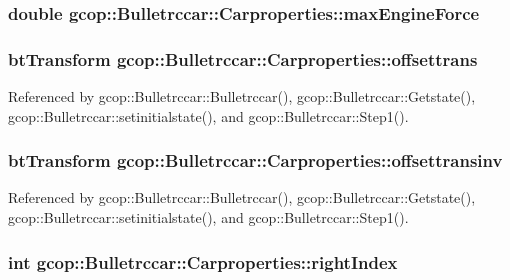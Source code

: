 \subsubsection[{max\-Engine\-Force}]{\setlength{\rightskip}{0pt plus 5cm}double {\bf gcop\-::\-Bulletrccar\-::\-Carproperties\-::max\-Engine\-Force}}\label{structgcop_1_1Bulletrccar_1_1Carproperties_a1d82405d62cf0f7b07b8f841ffb00aec}
\subsubsection[{offsettrans}]{\setlength{\rightskip}{0pt plus 5cm}bt\-Transform {\bf gcop\-::\-Bulletrccar\-::\-Carproperties\-::offsettrans}}\label{structgcop_1_1Bulletrccar_1_1Carproperties_a66f14b79d8519d8f4e442fe1b606438e}


\-Referenced by gcop\-::\-Bulletrccar\-::\-Bulletrccar(), gcop\-::\-Bulletrccar\-::\-Getstate(), gcop\-::\-Bulletrccar\-::setinitialstate(), and gcop\-::\-Bulletrccar\-::\-Step1().

\subsubsection[{offsettransinv}]{\setlength{\rightskip}{0pt plus 5cm}bt\-Transform {\bf gcop\-::\-Bulletrccar\-::\-Carproperties\-::offsettransinv}}\label{structgcop_1_1Bulletrccar_1_1Carproperties_a52dbef973f0c37c281dc3ca70199e873}


\-Referenced by gcop\-::\-Bulletrccar\-::\-Bulletrccar(), gcop\-::\-Bulletrccar\-::\-Getstate(), gcop\-::\-Bulletrccar\-::setinitialstate(), and gcop\-::\-Bulletrccar\-::\-Step1().

\subsubsection[{right\-Index}]{\setlength{\rightskip}{0pt plus 5cm}int {\bf gcop\-::\-Bulletrccar\-::\-Carproperties\-::right\-Index}}\label{structgcop_1_1Bulletrccar_1_1Carproperties_a1d2b63c8e493fa2dc0aa379da47df7a4}



